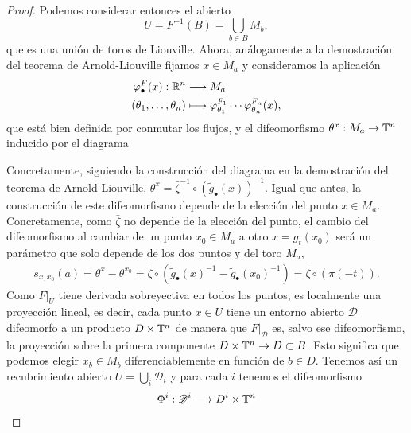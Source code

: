 \begin{proof}
  Podemos considerar entonces el abierto 
  \begin{equation*}
    U=F^{-1}(B)=\bigcup_{b\in B}M_b,
  \end{equation*}
  que es una unión de toros de Liouville. Ahora, análogamente a la demostración del teorema de Arnold-Liouville fijamos $x\in M_a$ y consideramos la aplicación
  \begin{align*}
    \varphi^F_\bullet(x) :\mathbb{R}^n&\longrightarrow M_a\\ 
    (\theta_1,\dots,\theta_n) &\longmapsto \varphi_{\theta_1}^{F_1}\cdots \varphi_{\theta_n}^{F_n}(x), 
    \end{align*}
    que está bien definida por conmutar los flujos, y el difeomorfismo $\theta^x:M_a\rightarrow \mathbb{T}^n$ inducido por el diagrama
    \begin{center}
     \end{center}
     Concretamente, siguiendo la construcción del diagrama en la demostración del teorema de Arnold-Liouville, $\theta^x=\bar{\zeta}^{-1}\circ (\tilde{g}_\bullet(x))^{-1}$. Igual que antes, la construcción de este difeomorfismo depende de la elección del punto $x\in M_a$. Concretamente, como $\bar{\zeta}$ no depende de la elección del punto, el cambio del difeomorfismo al cambiar de un punto $x_0\in M_a$ a otro $x=g_t(x_0)$ será un parámetro que solo depende de los dos puntos y del toro $M_a$,
     \begin{align*}
       s_{x,x_0}(a)=\theta^x-\theta^{x_0}=\bar{\zeta}\circ (\tilde{g}_\bullet(x)^{-1}-\tilde{g}_\bullet(x_0)^{-1}) = \bar{\zeta} \circ (\pi(-t)).
     \end{align*}
     Como $F|_{U}$ tiene derivada sobreyectiva en todos los puntos, es localmente una proyección lineal, es decir, cada punto $x\in U$ tiene un entorno abierto $\mathscr{D}$ difeomorfo a un producto $D\times \mathbb{T}^n$ de manera que $F|_{\mathscr{D}}$ es, salvo ese difeomorfismo, la proyección sobre la primera componente $D\times \mathbb{T}^n \rightarrow D\subset B$. Esto significa que podemos elegir $x_b\in M_b$ diferenciablemente en función de $b\in D$. 
     Tenemos así un recubrimiento abierto $U=\bigcup_i \mathscr D_i$ y para cada $i$ tenemos el difeomorfismo
       \begin{align*}
	 \Phi^i :\mathscr{D}^i&\longrightarrow D^i\times \TT^n\\ 

\end{align*}
\end{proof}
